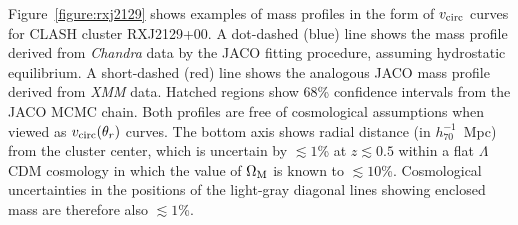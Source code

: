 Figure~\ref{figure:rxj2129} shows examples of mass profiles in the form of $v_{\rm circ}$ curves for CLASH cluster RXJ2129+00.  A dot-dashed (blue) line shows the mass profile derived from {\em Chandra} data by the JACO fitting procedure, assuming hydrostatic equilibrium.  A short-dashed (red) line shows the analogous JACO mass profile derived from {\em XMM} data.  Hatched regions show 68\% confidence intervals from the JACO MCMC chain.  Both profiles are free of cosmological assumptions when viewed as $v_{\rm circ}(\theta_r)$ curves.  The bottom axis shows radial distance (in $h_{70}^{-1}$~Mpc) from the cluster center, which is uncertain by $\lesssim 1$\% at $z \lesssim 0.5$ within a flat $\Lambda$CDM cosmology in which the value of $\Omega_{\rm M}$ is known to $\lesssim 10$\%.  Cosmological uncertainties in the positions of the light-gray diagonal lines showing enclosed mass are therefore also $\lesssim 1$\%.


